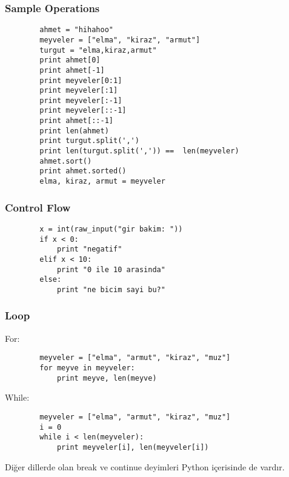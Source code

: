 \documentclass[10pt, compress]{beamer}
\begin{document}
\begin{frame}[fragile]
\frametitle{Sample Operations}    
    \begin{verbatim}
        ahmet = "hihahoo"
        meyveler = ["elma", "kiraz", "armut"]
        turgut = "elma,kiraz,armut"
        print ahmet[0]
        print ahmet[-1]
        print meyveler[0:1]
        print meyveler[:1]
        print meyveler[:-1]
        print meyveler[::-1]
        print ahmet[::-1]
        print len(ahmet)
        print turgut.split(',')
        print len(turgut.split(',')) ==  len(meyveler)
        ahmet.sort()
        print ahmet.sorted() 
        elma, kiraz, armut = meyveler
    \end{verbatim}     
\end{frame}

\begin{frame}[fragile]
\frametitle{Control Flow}    
    \begin{verbatim}
        x = int(raw_input("gir bakim: "))
        if x < 0:
            print "negatif"
        elif x < 10:
            print "0 ile 10 arasinda"
        else:
            print "ne bicim sayi bu?"
    \end{verbatim}     
\end{frame}

\begin{frame}[fragile]
\frametitle{Loop}    
    For:
    \begin{verbatim}
        meyveler = ["elma", "armut", "kiraz", "muz"]
        for meyve in meyveler:
            print meyve, len(meyve)
    \end{verbatim}   
    While:
    \begin{verbatim}
        meyveler = ["elma", "armut", "kiraz", "muz"]
        i = 0
        while i < len(meyveler):
            print meyveler[i], len(meyveler[i])
    \end{verbatim}    
    Diğer dillerde olan \alert{break} ve \alert{continue} deyimleri Python içerisinde de vardır.
\end{frame}
\end{document}
